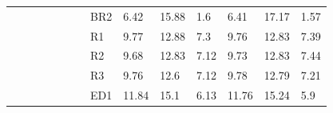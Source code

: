 {\begin{minipage}{\linewidth}
\begin{tabular}{l|l|l|l|c|c|r|l|lll|lll}
                                              &                                          &                                           &                                           &                                            &                                                                                         &                                                                                                & BR2                                       & 6.42  & 15.88 & 1.6       & 6.41  & 17.17 & 1.57       \\
                                              &                                          &                                           &                                           &                                            &                                                                                         &                                                                                                & R1                                        & 9.77  & 12.88 & 7.3       & 9.76  & 12.83 & 7.39       \\
                                              &                                          &                                           &                                           &                                            &                                                                                         &                                                                                                & R2                                        & 9.68  & 12.83 & 7.12      & 9.73  & 12.83 & 7.44       \\
                                              &                                          &                                           &                                           &                                            &                                                                                         &                                                                                                & R3                                        & 9.76  & 12.6  & 7.12      & 9.78  & 12.79 & 7.21       \\
                                              &                                          &                                           &                                           &                                            &                                                                                         &                                                                                                & ED1                                       & 11.84 & 15.1  & 6.13      & 11.76 & 15.24 & 5.9        \\

\end{tabular}
\end{minipage}}
